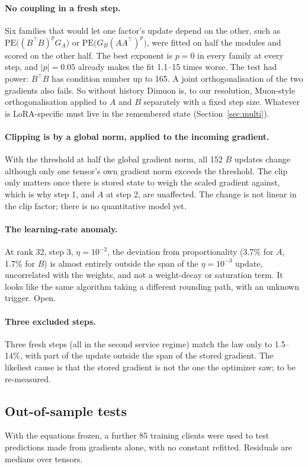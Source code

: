 \documentclass[11pt]{article}
\begin{document}
\paragraph{No coupling in a fresh step.} Six families that would let one factor's update depend
on the other, such as $\mathrm{PE}\big((B^\top B)^pG_A\big)$ or
$\mathrm{PE}\big(G_B(AA^\top)^p\big)$, were fitted on half the modules and scored on the other
half. The best exponent is $p=0$ in every family at every step, and $|p|=0.05$ already makes
the fit 1.1--15 times worse. The test had power: $B^\top B$ has condition number up to 165.
A joint orthogonalisation of the two gradients also fails. So without history Dimuon is, to our
resolution, Muon-style orthogonalisation applied to $A$ and $B$ separately with a fixed step
size. Whatever is LoRA-specific must live in the remembered state
(Section~\ref{sec:multi}).

\paragraph{Clipping is by a global norm, applied to the incoming gradient.} With the threshold
at half the global gradient norm, all 152 $B$ updates change although only one tensor's own
gradient norm exceeds the threshold. The clip only matters once there is stored state to weigh
the scaled gradient against, which is why step 1, and $A$ at step 2, are unaffected. The change
is not linear in the clip factor; there is no quantitative model yet.

\paragraph{The learning-rate anomaly.} At rank 32, step 3, $\eta=10^{-2}$, the deviation from
proportionality (3.7\% for $A$, 1.7\% for $B$) is almost entirely outside the span of the
$\eta=10^{-3}$ update, uncorrelated with the weights, and not a weight-decay or saturation
term. It looks like the same algorithm taking a different rounding path, with an unknown
trigger. Open.

\paragraph{Three excluded steps.} Three fresh steps (all in the second service regime) match
the law only to 1.5--14\%, with part of the update outside the span of the stored gradient.
The likeliest cause is that the stored gradient is not the one the optimizer saw; to be
re-measured.
\subsection{Out-of-sample tests}\label{sec:predict}
With the equations frozen, a further 85 training clients were used to test predictions made
from gradients alone, with no constant refitted. Residuals are medians over tensors.
\end{document}
